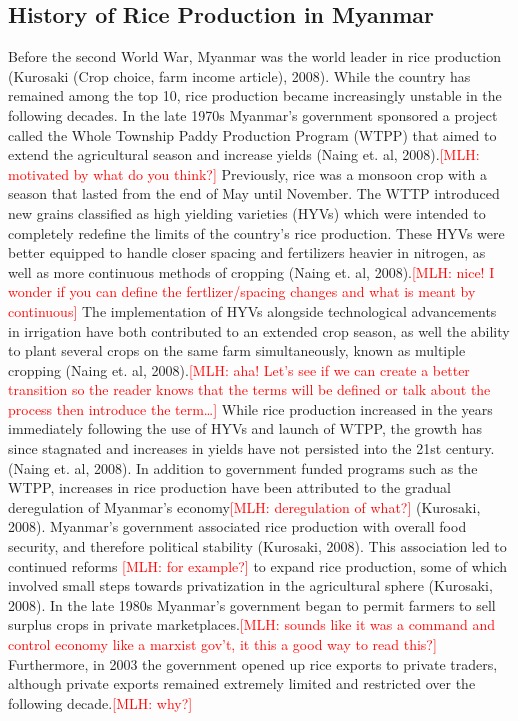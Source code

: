 \documentclass{book}\usepackage{knitr}
\newcommand{\red}[1]{\textcolor{red}{[MLH: #1]}}
\begin{document}
\begin{knitrout}
\begin{kframe}
{\section{History of Rice Production in Myanmar}

Before the second World War, Myanmar was the world leader in rice production (Kurosaki (Crop choice, farm income article), 2008). While the country has remained among the top 10, rice production became increasingly unstable in the following decades. In the late 1970s Myanmar’s government sponsored a project called the Whole Township Paddy Production Program (WTPP) that aimed to extend the agricultural season and increase yields (Naing et. al, 2008).\red{motivated by what do you think?} Previously, rice was a monsoon crop with a season that lasted from the end of May until November. The WTTP introduced new grains classified as high yielding varieties (HYVs) which were intended to completely redefine the limits of the country’s rice production. These HYVs were better equipped to handle closer spacing and fertilizers heavier in nitrogen, as well as more continuous methods of cropping (Naing et. al, 2008).\red{nice!  I wonder if you can define the fertlizer/spacing changes and what is meant by continuous}
	The implementation of HYVs alongside technological advancements in irrigation have both contributed to an extended crop season, as well the ability to plant several crops on the same farm simultaneously, known as multiple cropping (Naing et. al, 2008).\red{aha!  Let's see if we can create a better transition so the reader knows that the terms will be defined or talk about the process then introduce the term\ldots} While rice production increased in the years immediately following the use of HYVs and launch of WTPP, the growth has since stagnated and increases in yields have not persisted into the 21st century. (Naing et. al, 2008).
	In addition to government funded programs such as the WTPP, increases in rice production have been attributed to the gradual deregulation of Myanmar’s economy\red{deregulation of what?} (Kurosaki, 2008). Myanmar’s government associated rice production with overall food security, and therefore political stability (Kurosaki, 2008). This association led to continued reforms \red{for example?} to expand rice production, some of which involved small steps towards privatization in the agricultural sphere (Kurosaki, 2008). In the late 1980s Myanmar’s government began to permit farmers to sell surplus crops in private marketplaces.\red{sounds like it was a command and control economy like a marxist gov't, it this a good way to read this?} Furthermore, in 2003 the government opened up rice exports to private traders, although private exports remained extremely limited and restricted over the following decade.\red{why?} 
}
\end{kframe}
\end{knitrout}
\end{document}
